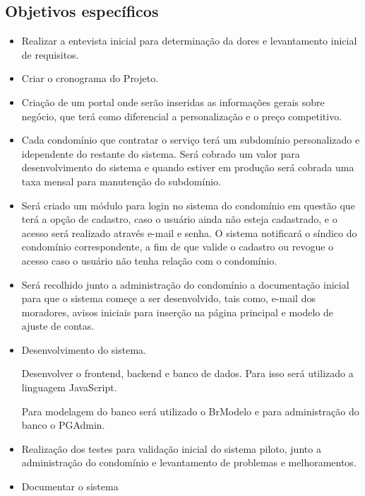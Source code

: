 \subsection{Objetivos específicos}
\begin{itemize}
    \item Realizar a entevista inicial para determinação da dores e levantamento
    inicial de requisitos.
    
    \item Criar o cronograma do Projeto.
    
    \item Criação de um portal onde serão inseridas as informações gerais sobre
negócio, que terá como diferencial a personalização e o preço competitivo.
    
    \item Cada condomínio que contratar o serviço terá um subdomínio personalizado
e idependente do restante do sistema. Será cobrado um valor para desenvolvimento
do sistema e quando estiver em produção será cobrada uma taxa mensal para manutenção
do subdomínio.

    \item Será criado um módulo para login no sistema do condomínio em questão
que terá a opção de cadastro, caso o usuário ainda não esteja cadastrado,
e o acesso será realizado através e-mail e senha. O sistema notificará o síndico
do condomínio correspondente, a fim de que valide o cadastro ou revogue o acesso
caso o usuário não tenha relação com o condomínio.

    \item Será recolhido junto a administração do condomínio a documentação 
inicial para que o sistema começe a ser desenvolvido, tais como, e-mail
dos moradores, avisos iniciais para inserção na página principal e modelo de
ajuste de contas.

    \item Desenvolvimento do sistema.
    
    Desenvolver o frontend, backend e banco de dados. Para isso será 
utilizado a linguagem JavaScript.

    Para modelagem do banco será utilizado o BrModelo e para administração do banco
o PGAdmin.

    \item Realização dos testes para validação inicial do sistema piloto, junto a
administração do condomínio e levantamento de problemas e melhoramentos.

    \item Documentar o sistema
    
\end{itemize}

